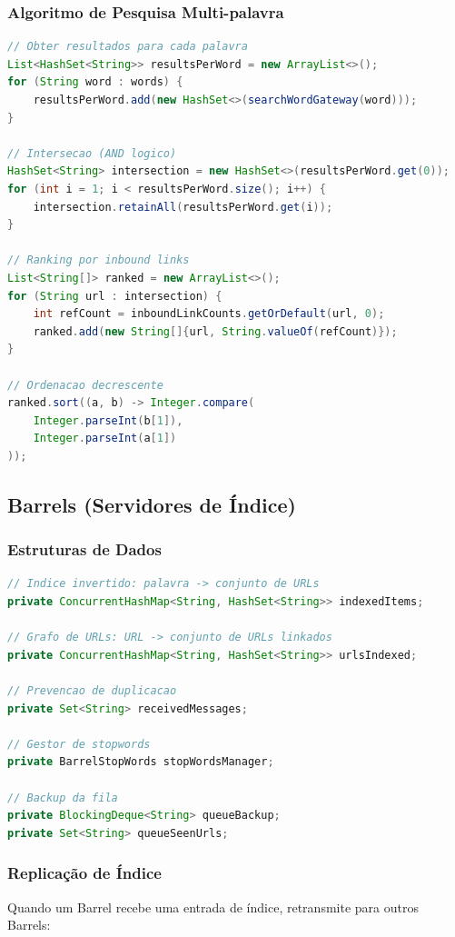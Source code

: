 \documentclass[12pt,a4paper]{article}
\begin{document}
\subsubsection{Algoritmo de Pesquisa Multi-palavra}
\begin{lstlisting}[language=Java, caption={Interseção de resultados para múltiplas palavras}]
// Obter resultados para cada palavra
List<HashSet<String>> resultsPerWord = new ArrayList<>();
for (String word : words) {
    resultsPerWord.add(new HashSet<>(searchWordGateway(word)));
}

// Intersecao (AND logico)
HashSet<String> intersection = new HashSet<>(resultsPerWord.get(0));
for (int i = 1; i < resultsPerWord.size(); i++) {
    intersection.retainAll(resultsPerWord.get(i));
}

// Ranking por inbound links
List<String[]> ranked = new ArrayList<>();
for (String url : intersection) {
    int refCount = inboundLinkCounts.getOrDefault(url, 0);
    ranked.add(new String[]{url, String.valueOf(refCount)});
}

// Ordenacao decrescente
ranked.sort((a, b) -> Integer.compare(
    Integer.parseInt(b[1]), 
    Integer.parseInt(a[1])
));
\end{lstlisting}

\subsection{Barrels (Servidores de Índice)}

\subsubsection{Estruturas de Dados}
\begin{lstlisting}[language=Java, caption={Estruturas principais dos Barrels}]
// Indice invertido: palavra -> conjunto de URLs
private ConcurrentHashMap<String, HashSet<String>> indexedItems;

// Grafo de URLs: URL -> conjunto de URLs linkados
private ConcurrentHashMap<String, HashSet<String>> urlsIndexed;

// Prevencao de duplicacao
private Set<String> receivedMessages;

// Gestor de stopwords
private BarrelStopWords stopWordsManager;

// Backup da fila
private BlockingDeque<String> queueBackup;
private Set<String> queueSeenUrls;
\end{lstlisting}

\subsubsection{Replicação de Índice}
Quando um Barrel recebe uma entrada de índice, retransmite para outros Barrels:
\end{document}
